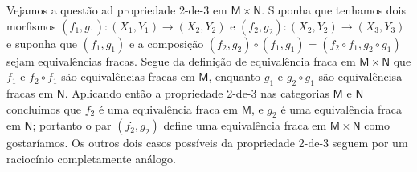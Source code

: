 \begin{exem}
  Vejamos a questão ad propriedade 2-de-3 em $\mathsf{M} \times \mathsf{N}$. Suponha que tenhamos dois morfismos $(f_1,g_1): (X_1,Y_1) \to (X_2,Y_2)$ e $(f_2,g_2): (X_2,Y_2) \to (X_3,Y_3)$ e suponha que $(f_1,g_1)$ e a composição $(f_2,g_2) \circ (f_1,g_1) = (f_2 \circ f_1,g_2 \circ g_1)$ sejam equivalências fracas.
  Segue da definição de equivalência fraca em $\mathsf{M} \times \mathsf{N}$ que $f_1$ e $f_2 \circ f_1$ são equivalências fracas em $\mathsf{M}$, enquanto $g_1$ e $g_2 \circ g_1$ são equivalêncisa fracas em $\mathsf{N}$.
  Aplicando então a propriedade 2-de-3 nas categorias $\mathsf{M}$ e $\mathsf{N}$ concluímos que $f_2$ é uma equivalência fraca em $\mathsf{M}$, e $g_2$ é uma equivalência fraca em $\mathsf{N}$; portanto o par $(f_2,g_2)$ define uma equivalência fraca em $\mathsf{M} \times \mathsf{N}$ como gostaríamos.
  Os outros dois casos possíveis da propriedade 2-de-3 seguem por um raciocínio completamente análogo.
\end{exem}

